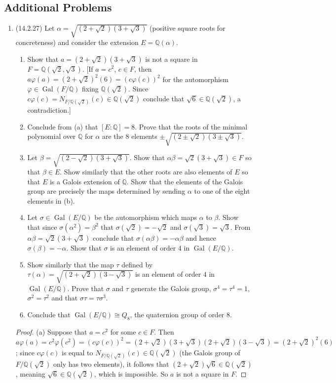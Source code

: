 \documentclass[11pt]{article}
\DeclareMathOperator{\Gal}{Gal}
\begin{document}
\subsection*{Additional Problems}
\begin{enumerate}
    \item (14.2.27) Let $\alpha = \sqrt{(2+\sqrt{2})(3+\sqrt{3})}$ (positive square roots for concreteness) and consider the extension $E = \mathbb{Q}(\alpha)$. \begin{enumerate}
        \item Show that $a = (2+\sqrt{2})(3+\sqrt{3})$ is not a square in $F = \mathbb{Q}(\sqrt{2}, \sqrt{3})$. [If $a = c^2$, $c\in F$, then $a\varphi(a) = (2+\sqrt{2})^2(6) = (c\varphi(c))^2$ for the automorphism $\varphi\in \Gal(F/\mathbb{Q})$ fixing $\mathbb{Q}(\sqrt{2})$. Since $c\varphi(c) = N_{F/\mathbb{Q}(\sqrt{2})}(c)\in \mathbb{Q}(\sqrt{2})$ conclude that $\sqrt{6}\in \mathbb{Q}(\sqrt{2})$, a contradiction.]
        \item Conclude from (a) that $[E\colon \mathbb{Q}] = 8$. Prove that the roots of the minimal polynomial over $\mathbb{Q}$ for $\alpha$ are the $8$ elements $\pm\sqrt{(2\pm\sqrt{2})(3\pm\sqrt{3})}$.
        \item Let $\beta = \sqrt{(2-\sqrt{2})(3+\sqrt{3})}$. Show that $\alpha\beta = \sqrt{2}(3+\sqrt{3})\in F$ so that $\beta\in E$. Show similarly that the other roots are also elements of $E$ so that $E$ is a Galois extension of $\mathbb{Q}$. Show that the elements of the Galois group are precisely the maps determined by sending $\alpha$ to one of the eight elements in (b).
        \item Let $\sigma\in \Gal(E/\mathbb{Q})$ be the automorphism which maps $\alpha$ to $\beta$. Show that since $\sigma(\alpha^2) = \beta^2$ that $\sigma(\sqrt{2}) = -\sqrt{2}$ and $\sigma(\sqrt{3}) = \sqrt{3}$. From $\alpha\beta = \sqrt{2}(3+\sqrt{3})$ conclude that $\sigma(\alpha\beta) = -\alpha\beta$ and hence $\sigma(\beta) = -\alpha$. Show that $\sigma$ is an element of order $4$ in $\Gal(E/\mathbb{Q})$.
        \item Show similarly that the map $\tau$ defined by $\tau(\alpha) = \sqrt{(2+\sqrt{2})(3-\sqrt{3})}$ is an element of order $4$ in $\Gal(E/\mathbb{Q})$. Prove that $\sigma$ and $\tau$ generate the Galois group, $\sigma^4=\tau^4=1$, $\sigma^2=\tau^2$ and that $\sigma\tau = \tau\sigma^3$.
        \item Conclude that $\Gal(E/\mathbb{Q})\cong Q_8$, the quaternion group of order $8$.
    \end{enumerate}
    \begin{proof}
        (a) Suppose that $a = c^2$ for some $c\in F$. Then $a\varphi(a) = c^2\varphi(c^2) = (c\varphi(c))^2 = (2+\sqrt{2})(3+\sqrt{3})(2+\sqrt{2})(3-\sqrt{3}) = (2+\sqrt{2})^2(6)$; since $c\varphi(c)$ is equal to $N_{F/\mathbb{Q}(\sqrt{2})}(c)\in \mathbb{Q}(\sqrt{2})$ (the Galois group of $F/\mathbb{Q}(\sqrt{2})$ only has two elements), it follows that $(2+\sqrt{2})\sqrt{6}\in \mathbb{Q}(\sqrt{2})$, meaning $\sqrt{6}\in\mathbb{Q}(\sqrt{2})$, which is impossible. So $a$ is not a square in $F$.


\end{proof}
\end{enumerate}
\end{document}
